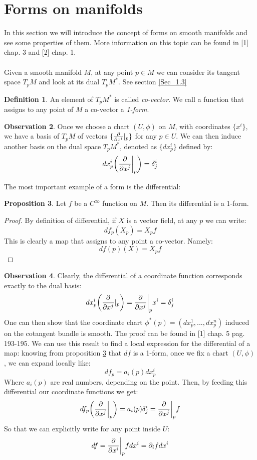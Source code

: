 \documentclass[12pt,a4paper]{report}
\theoremstyle{definition}
\newtheorem{Def}{Definition}[chapter]
\theoremstyle{Theorem}
\newtheorem{Prop}[Def]{Proposition}
\theoremstyle{definition}
\theoremstyle{definition}
\newtheorem{Obs}[Def]{Observation}
\begin{document}
	\section{Forms on manifolds}
	In this section we will introduce the concept of forms on smooth manifolds and see some properties of them. More information on this topic can be found in [1] chap. 3 and [2] chap. 1.\\
	\\
	Given a smooth manifold $M$, at any point $p\in M$ we can consider its tangent space $T_pM$ and look at its dual $T_pM^*$. See section \ref{Sec_1.3} 
	\begin{Def}
		An element of $T_pM^*$ is called \textit{co-vector}. We call a function that assigns to any point of $M$ a co-vector a \textit{1-form}.
	\end{Def}
	\begin{Obs}
		Once we choose a chart $(U,\phi)$ on $M$, with coordinates $\{x^i\}$, we have a basis of $T_pM$ of vectors $\{{\partial\over \partial x^i}|_p\}$ for any $p\in U$. We can then induce another basis on the dual space $T_pM^*$, denoted as $\{dx^i_p\}$ defined by:
		$$dx^i_p\bigg({\partial\over \partial x^j}\bigg|_p\bigg)=\delta^i_j$$
	\end{Obs}
	\begin{comment}
		\begin{Obs}
			Note that on a metric manifold $(M,g)$, after choosing a chart, we can expand the metric tensor in local coordinates:
			$$g=g_{ij}dx^i\otimes dx^j$$  
		\end{Obs}
	\end{comment}
	The most important example of a form is the differential:
	\begin{Prop} \label{df_is_a_form}
		Let $f$ be a $C^\infty$ function on $M$. Then its differential is a 1-form.
	\end{Prop}
	\begin{proof}
		By definition of differential, if $X$ is a vector field, at any $p$ we can write:
		$$df_p(X_p)=X_pf$$
		This is clearly a map that assigns to any point a co-vector. Namely:
		$$df(p)(X)=X_pf$$
	\end{proof}
	\begin{Obs}
		Clearly, the differential of a coordinate function corresponds exactly to the dual basis:
		$$dx^i_p\bigg({\partial\over \partial x^j}|_p\bigg)={\partial\over \partial x^j}\bigg|_px^i=\delta^i_j$$
		One can then show that the coordinate chart $\phi^*(p)=(dx^1_p,...,dx^n_p)$ induced on the cotangent bundle is smooth. The proof can be found in [1] chap. 5 pag. 193-195.
		We can use this result to find a local expression for the differential of a map:
		knowing from proposition \ref{df_is_a_form} that $df$ is a 1-form, once we fix a chart $(U,\phi)$, we can expand locally like:
		$$df_p=a_i(p)dx^i_p$$
		Where $a_i(p)$ are real numbers, depending on the point.
		Then, by feeding this differential our coordinate functions we get:
		$$df_p\bigg({\partial\over \partial x^j}\bigg|_p\bigg)=a_i(p)\delta^i_j={\partial\over \partial x^j}\bigg|_pf$$
		So that we can explicitly write for any point inside $U$:
		$$df={\partial\over \partial x^i}\bigg|_pfdx^i=\partial_ifdx^i$$
	\end{Obs}
\end{document}
